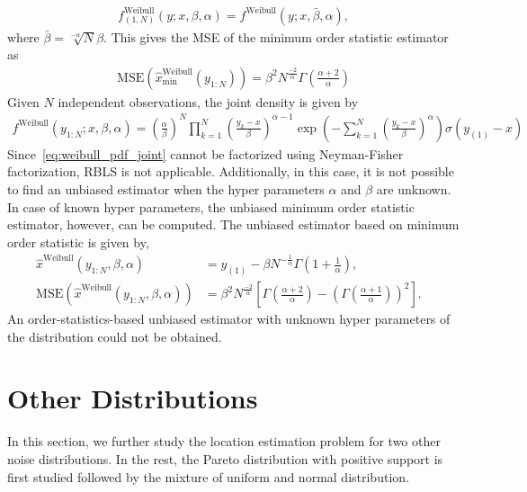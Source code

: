 \documentclass{article}
\newcommand{\MSE}{\mathrm{MSE}}
\begin{document}
%
%
\begin{align}
f^{\mathrm{Weibull}}_{(1,N)}(y;x,\beta,\alpha) = f^{\mathrm{Weibull}}(y;x,\bar{\beta},\alpha),
\end{align}
%
%
where $\bar{\beta}=\sqrt[-\alpha]{N}\beta$. This gives the MSE of the minimum order statistic estimator as
%
%
\begin{align}
\MSE(\hat{x}_{\mathrm{min}}^{\mathrm{Weibull}}(y_{1:N})) = \beta^2N^{\frac{-2}{\alpha}}\Gamma(\frac{\alpha+2}{\alpha})
\end{align}
%
%
Given $N$ independent observations, the joint density is given by
%
%
	\begin{align}
f^{\mathrm{Weibull}}(y_{1:N};x,\beta,\alpha)=(\frac{\alpha}{\beta})^N\prod_{k=1}^{N}\left(\frac{y_k-x}{\beta}\right)^{\alpha-1}\exp(-\sum_{k=1}^{N}(\frac{y_k-x}{\beta})^\alpha)\sigma(y_{(1)} - x)
\label{eq:weibull_pdf_joint}
\end{align}
%
%
Since~\eqref{eq:weibull_pdf_joint} cannot be factorized using Neyman-Fisher factorization, RBLS is not applicable. Additionally, in this case, it is not possible to find an unbiased estimator when the hyper parameters $\alpha$ and $\beta$ are unknown. In case of known hyper parameters, the unbiased minimum order statistic estimator, however, can be computed.  The unbiased estimator based on minimum order statistic is given by,
%
%
	\begin{align}
	\hat{x}^{\mathrm{Weibull}}(y_{1:N},\beta,\alpha) &= y_{(1)}- \beta N^{-\frac{1}{\alpha}}\Gamma(1+\frac{1}{\alpha}),
	&\nonumber\\ 
	\MSE(\hat{x}^{\mathrm{Weibull}}(y_{1:N},\beta,\alpha)) &=\beta^2N^{\frac{-2}{\alpha}}\left[\Gamma(\frac{\alpha+2}{\alpha})-\left(\Gamma(\frac{\alpha+1}{\alpha})\right)^2\right].
	\end{align}
%
%
An order-statistics-based unbiased estimator with unknown hyper parameters of the distribution could not be obtained.
\section{Other Distributions}\label{sec:other_distributions}
In this section, we further study the location estimation problem for two other noise distributions. In the rest, the Pareto distribution with positive support is first studied followed by the mixture of uniform and normal distribution.
\end{document}
